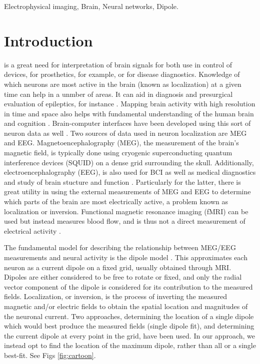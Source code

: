 \documentclass[journal]{IEEEtran}
\begin{document}
\begin{IEEEkeywords}
Electrophysical imaging, Brain, Neural networks, Dipole.
\end{IEEEkeywords}



\IEEEpeerreviewmaketitle



\section{Introduction}

 is a great need for interpretation of brain signals for both use in control of devices, for prosthetics, for example, or for disease diagnostics. Knowledge of which neurons are most active in the brain (known as localization) at a given time can help in a unmber of areas. It can aid in diagnosis and presurgical evaluation of epileptics, for instance \cite{knake2006value}. Mapping brain activity with high resolution in time and space also helps with fundamental understanding of the human brain and cognition \cite{de2001localization}. Brain-computer interfaces have been developed using this sort of neuron data as well \cite{mellinger2007meg}. Two sources of data used in neuron localization are MEG and EEG. Magnetoencephalography (MEG), the measurement of the brain's magnetic field, is typically done using cryogenic superconducting quantum interference devices (SQUID) on a dense grid surrounding the skull. Additionally, electroencephalography (EEG), is also used for BCI as well as medical diagnostics and study of brain stucture and function \cite{da2008impact}. Particularly for the latter, there is great utility in using the external measurements of MEG and EEG to determine which parts of the brain are most electrically active, a problem known as localization or inversion. Functional magnetic resonance imaging (fMRI) can be used but instead measures blood flow, and is thus not a direct measurement of electrical activity \cite{sharon2007advantage}. 

The fundamental model for describing the relationship between MEG/EEG measurements and neural activity is the dipole model \cite{mosher1992multiple}. This approximates each neuron as a current dipole on a fixed grid, usually obtained through MRI. Dipoles are either considered to be free to rotate or fixed, and only the radial vector component of the dipole is considered for its contribution to the measured fields. Localization, or inversion, is the process of inverting the measured magnetic and/or electric fields to obtain the spatial location and magnitudes of the neuronal current. Two approaches, determining the location of a single dipole which would best produce the measured fields (single dipole fit), and determining the current dipole at every point in the grid, have been used. In our approach, we instead opt to find the location of the maximum dipole, rather than all or a single best-fit. See Figs \ref{fig:cartoon}.
\end{document}
